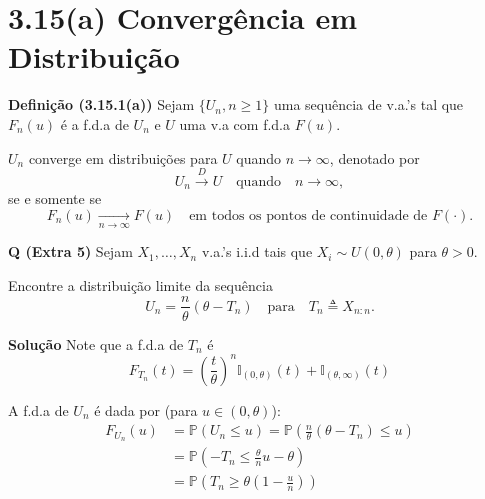 \section*{3.15(a) Convergência em Distribuição}

\textbf{Definição (3.15.1(a))} Sejam $\{U_n, n \geq 1\}$ uma sequência de v.a.'s tal que $F_n(u)$ é a f.d.a de $U_n$ e $U$ uma v.a com f.d.a $F(u)$.

$U_n$ converge em distribuições para $U$ quando $n \to \infty$, denotado por 
\[
U_n \xrightarrow{D} U \quad \text{quando} \quad n \to \infty,
\]
se e somente se
\[
F_n(u) \xrightarrow[n \to \infty]{} F(u) \quad \text{em todos os pontos de continuidade de } F(\cdot).
\]

\textbf{Q (Extra 5)} Sejam $X_1, \ldots, X_n$ v.a.'s i.i.d tais que $X_i \sim U(0, \theta)$ para $\theta > 0$. 

Encontre a distribuição limite da sequência
\[
U_n = \frac{n}{\theta} (\theta - T_n) \quad \text{para} \quad T_n \triangleq X_{n:n}.
\]

\textbf{Solução} Note que a f.d.a de $T_n$ é
\begin{equation}
F_{T_n}(t) = \left( \frac{t}{\theta} \right)^n \mathbb{I}_{(0,\theta)}(t) + \mathbb{I}_{(\theta, \infty)}(t)
\end{equation}

A f.d.a de $U_n$ é dada por (para $u \in (0,\theta)$):
\begin{equation}
\begin{aligned}
F_{U_n}(u) &= \mathbb{P}(U_n \leq u) = \mathbb{P}\left( \frac{n}{\theta} (\theta - T_n) \leq u \right) \\
&= \mathbb{P}\left( -T_n \leq \frac{\theta}{n} u - \theta \right) \\
&= \mathbb{P}\left( T_n \geq \theta \left( 1 - \frac{u}{n} \right) \right)
\end{aligned}
\end{equation}